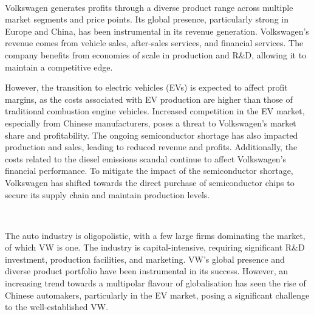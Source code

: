 \documentclass[10pt]{article}
\begin{document}
\



\noindent Volkswagen generates profits through a diverse product range across multiple market segments and price points. Its global presence, particularly strong in Europe and China, has been instrumental in its revenue generation. Volkswagen's revenue comes from vehicle sales, after-sales services, and financial services. The company benefits from economies of scale in production and R\&D, allowing it to maintain a competitive edge\autocite{VolkswagensEarningsDisappoint09:07:19+01:00}.

However, the transition to electric vehicles (EVs) is expected to affect profit margins, as the costs associated with EV production are higher than those of traditional combustion engine vehicles. Increased competition in the EV market, especially from Chinese manufacturers, poses a threat to Volkswagen's market share and profitability. The ongoing semiconductor shortage has also impacted production and sales, leading to reduced revenue and profits. Additionally, the costs related to the diesel emissions scandal continue to affect Volkswagen's financial performance. To mitigate the impact of the semiconductor shortage, Volkswagen has shifted towards the direct purchase of semiconductor chips to secure its supply chain and maintain production levels\autocite{VWGroupBuy2023}.

\

The auto industry is oligopolistic, with a few large firms dominating the market, of which VW is one. The industry is capital-intensive, requiring significant R\&D investment, production facilities, and marketing. VW's global presence and diverse product portfolio have been instrumental in its success\autocite{vwgroupHistory1999}. However, an increasing trend towards a multipolar flavour of globalisation has seen the rise of Chinese automakers, particularly in the EV market, posing a significant challenge to the well-established VW\autocite{VolkswagensEarningsDisappoint09:07:19+01:00}.
\end{document}
